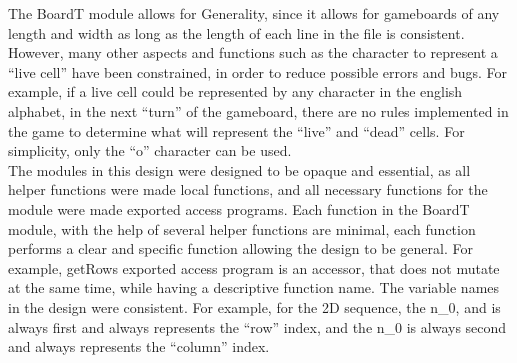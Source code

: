 \documentclass[12pt]{article}
\begin{document}
The BoardT module allows for Generality, since it allows for gameboards of any length and width as long as the length of each line in the file is consistent. However, many other aspects and functions such as the character to represent a ``live cell'' have been constrained, in order to reduce possible errors and bugs. For example, if a live cell could be represented by any character in the english alphabet, in the next ``turn'' of the gameboard, there are no rules implemented in the game to determine what will represent the ``live'' and ``dead'' cells. For simplicity, only the ``o'' character can be used.\\

The modules in this design were designed to be opaque and essential, as all helper functions were made local functions, and all necessary functions for the module were made exported access programs. Each function in the BoardT module, with the help of several helper functions are minimal, each function performs a clear and specific function allowing the design to be general. For example, getRows exported access program is an accessor, that does not mutate at the same time, while having a descriptive function name. The variable names in the design were consistent. For example, for the 2D sequence, the n\_0, and is always first and always represents the ``row'' index, and the n\_0 is always second and always represents the ``column'' index.\\
\end{document}
